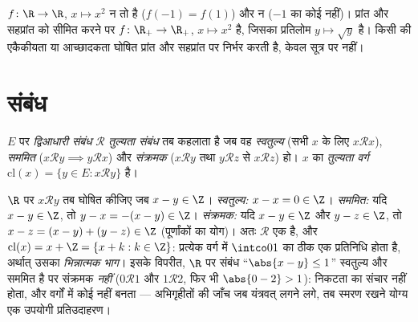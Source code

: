 \begin{example}\label{ex:b1:logic:injexamples}
$f \colon \R \to \R$, $x \mapsto x^2$ न तो  है ($f(-1) = f(1)$) और न
 ($-1$ का कोई  नहीं)। प्रांत और सहप्रांत को सीमित करने
पर $f \colon \R_+ \to \R_+$, $x \mapsto x^2$  है, जिसका
प्रतिलोम $y \mapsto \sqrt y$ है। किसी  की एकैकीयता या आच्छादकता
घोषित प्रांत और सहप्रांत पर निर्भर करती है, केवल सूत्र पर नहीं।
\end{example}

\section{संबंध}

\begin{definition}[तुल्यता संबंध]\label{def:b1:logic:equiv}
 $E$ पर \emph{द्विआधारी संबंध} $\mathcal{R}$ \emph{तुल्यता
संबंध} तब कहलाता है जब वह \emph{स्वतुल्य} (सभी $x$ के
लिए $x \mathbin{\mathcal{R}} x$), \emph{सममित} ($x \mathbin{\mathcal{R}} y
\implies y \mathbin{\mathcal{R}} x$) और \emph{संक्रमक} ($x
\mathbin{\mathcal{R}} y$ तथा $y \mathbin{\mathcal{R}} z$ से $x
\mathbin{\mathcal{R}} z$) हो। $x$ का \emph{तुल्यता वर्ग} $\mathrm{cl}(x) =
\{y \in E : x \mathbin{\mathcal{R}} y\}$ है।
\end{definition}

\begin{example}[तीनों अभिगृहीतों की जाँच]\label{ex:b1:logic:fracpart}
$\R$ पर $x \mathbin{\mathcal{R}} y$ तब घोषित कीजिए जब $x - y \in \Z$।
\emph{स्वतुल्य:} $x - x = 0 \in \Z$। \emph{सममित:} यदि $x - y \in \Z$, तो $y
- x = -(x - y) \in \Z$। \emph{संक्रमक:} यदि $x - y \in \Z$ और $y - z \in
\Z$, तो $x - z = (x - y) + (y - z) \in \Z$ (पूर्णांकों का योग)। अतः
$\mathcal R$ एक  है, और $\mathrm{cl}(x) = x + \Z = \{x + k : k
\in \Z\}$: प्रत्येक वर्ग में $\intco01$ का ठीक एक प्रतिनिधि होता है, अर्थात्
उसका \emph{भिन्नात्मक भाग}। इसके विपरीत, $\R$ पर संबंध ``$\abs{x - y} \leq
1$'' स्वतुल्य और सममित है पर संक्रमक \emph{नहीं} ($0 \mathbin{\mathcal R} 1$
और $1 \mathbin{\mathcal R} 2$, फिर भी $\abs{0 - 2} > 1$): निकटता का संचार
नहीं होता, और वर्गों में कोई  नहीं बनता --- अभिगृहीतों की जाँच जब
यंत्रवत् लगने लगे, तब स्मरण रखने योग्य एक उपयोगी प्रतिउदाहरण।
\end{example}

